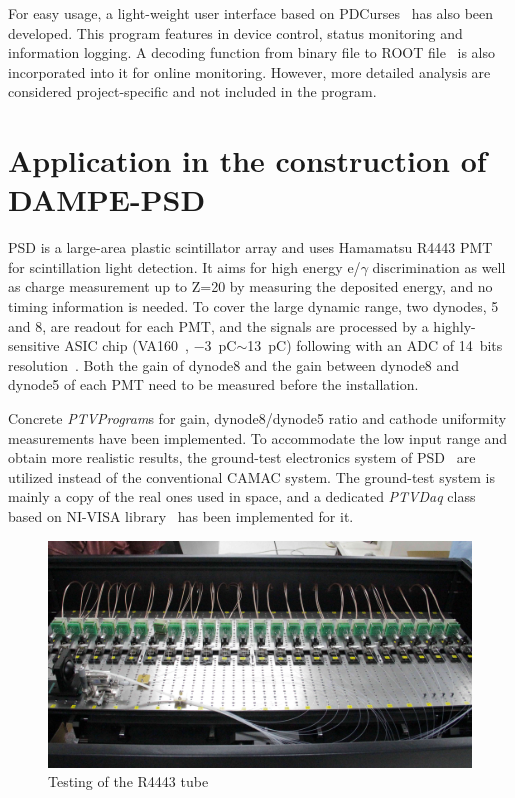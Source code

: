 \documentclass{JINST}
\begin{document}
For easy usage, a light-weight user interface based on PDCurses~\cite{pdcurses} has also been developed.
This program features in device control, status monitoring and information logging.
A decoding function from binary file to ROOT file~\cite{root} is also incorporated into it for online monitoring.
However, more detailed analysis are considered project-specific and not included in the program. 

\section{Application in the construction of DAMPE-PSD}
\label{sec:application}

PSD is a large-area plastic scintillator array and uses Hamamatsu R4443 PMT for scintillation light detection.
It aims for high energy e/$\gamma$ discrimination as well as charge measurement up to Z=20 by measuring the deposited energy, and no timing information is needed.
To cover the large dynamic range, two dynodes, 5 and 8, are readout for each PMT, 
and the signals are processed by a highly-sensitive ASIC chip (VA160~\cite{va160}, \SI{-3}{\pico\coulomb}$\sim$\SI{13}{\pico\coulomb}) following with an ADC of 14~bits resolution~\cite{fee}. 
Both the gain of dynode8 and the gain between dynode8 and dynode5 of each PMT need to be  measured before the installation.
	
Concrete \textit{PTVProgram}s for gain, dynode8/dynode5 ratio and cathode uniformity measurements have been implemented.
To accommodate the low input range and obtain more realistic results, the ground-test electronics system of PSD~\cite{fee} are utilized instead of the conventional CAMAC system. 
The ground-test system is mainly a copy of the real ones used in space, and a dedicated \textit{PTVDaq} class based on NI-VISA library~\cite{ni_visa} has been implemented for it.

\begin{figure}
	\centering
	\includegraphics[width=120mm]{integration1_crop.jpg}
	\caption{Testing of the R4443 tube}
	\label{fig:Integration}
\end{figure}
\end{document}
